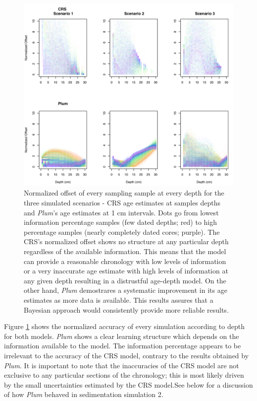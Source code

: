 \documentclass [10pt] {article}
\begin{document}



\begin{figure}[!]
	\begin{centering}
		\includegraphics[width=\linewidth]{depths.png}
		\caption{Normalized offset of every sampling sample at every depth for the three simulated scenarios - CRS age estimates at samples depths and \textit{Plum}'s age estimates at 1 cm intervals. Dots go from lowest information percentage samples (few dated depths; red) to high percentage samples (nearly completely dated cores; purple). The CRS's normalized offset shows no structure at any particular depth regardless of the available information. This means that the model can provide a reasonable chronology with low levels of information or a very inaccurate age estimate with high levels of information at any given depth resulting in a distrustful age-depth model. On the other hand, \textit{Plum} demostrares a systematic improvement in its age estimates as more data is available. This results assures that a Bayesian approach would consistently provide more reliable results.     }
		\label{fig:depths}
	\end{centering}
\end{figure}

Figure \ref{fig:depths} shows the normalized accuracy of every simulation according to depth for both models.
\textit{Plum} shows a clear learning structure which depends on the information available to the model.
The information percentage appears to be irrelevant to the accuracy of the CRS model, contrary to the results obtained by \textit{Plum}.
It is important to note that the inaccuracies of the CRS model are not exclusive to any particular sections of the chronology; this is most likely driven by the small uncertainties estimated by the CRS model.See below for a discussion of how \textit{Plum} behaved in sedimentation simulation 2.   
\end{document}
